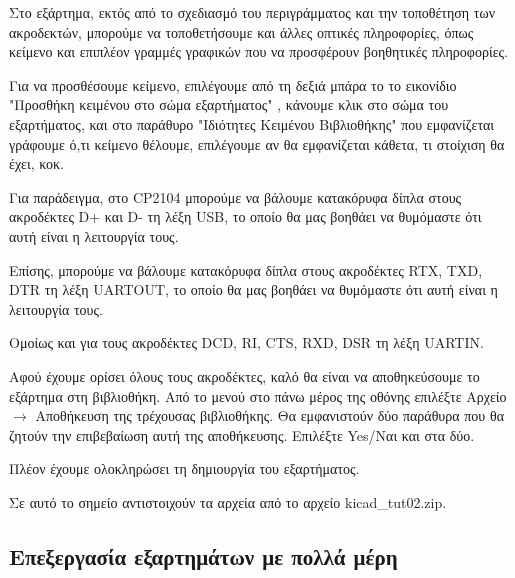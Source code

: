 \documentclass[a4paper]{article}
\begin{document}
\begin{figure}
  \begin{center}
    \label{fig:kicad-main}
  \end{center}
\end{figure}

Στο εξάρτημα, εκτός από το σχεδιασμό του περιγράμματος και την τοποθέτηση των ακροδεκτών, μπορούμε να τοποθετήσουμε και άλλες οπτικές πληροφορίες, όπως κείμενο και επιπλέον γραμμές γραφικών που να προσφέρουν βοηθητικές πληροφορίες.

Για να προσθέσουμε κείμενο, επιλέγουμε από τη δεξιά μπάρα το το εικονίδιο "Προσθήκη κειμένου στο σώμα εξαρτήματος" %
, κάνουμε κλικ στο σώμα του εξαρτήματος, και στο παράθυρο "Ιδιότητες Κειμένου Βιβλιοθήκης" που εμφανίζεται γράφουμε ό,τι κείμενο θέλουμε, επιλέγουμε αν θα εμφανίζεται κάθετα, τι στοίχιση θα έχει, κοκ.

\begin{figure}
  \begin{center}
    \label{fig:kicad-main}
  \end{center}
\end{figure}

Για παράδειγμα, στο \textenglish{CP2104} μπορούμε να βάλουμε κατακόρυφα δίπλα στους ακροδέκτες D+ και D- τη λέξη USB, το οποίο θα μας βοηθάει να θυμόμαστε ότι αυτή είναι η λειτουργία τους.

Επίσης, μπορούμε να βάλουμε κατακόρυφα δίπλα στους ακροδέκτες RTX, TXD, DTR τη λέξη UARTOUT, το οποίο θα μας βοηθάει να θυμόμαστε ότι αυτή είναι η λειτουργία τους.

Ομοίως και για τους ακροδέκτες DCD, RI, CTS, RXD, DSR τη λέξη UARTΙΝ.

Αφού έχουμε ορίσει όλους τους ακροδέκτες, καλό θα είναι να αποθηκεύσουμε το εξάρτημα στη βιβλιοθήκη. Από το μενού στο πάνω μέρος της οθόνης επιλέξτε Αρχείο $\rightarrow$ Αποθήκευση της τρέχουσας βιβλιοθήκης. Θα εμφανιστούν δύο παράθυρα που θα ζητούν την επιβεβαίωση αυτή της αποθήκευσης. Επιλέξτε Yes/Ναι και στα δύο.

Πλέον έχουμε ολοκληρώσει τη δημιουργία του εξαρτήματος.

Σε αυτό το σημείο αντιστοιχούν τα αρχεία από το αρχείο kicad\_tut02.zip.

\subsection{Επεξεργασία εξαρτημάτων με πολλά μέρη}
\end{document}
